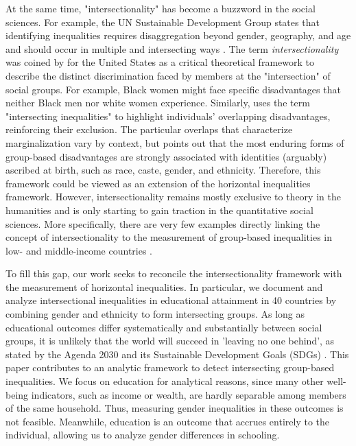 At the same time, "intersectionality" has become a buzzword in the social sciences. For example, the UN Sustainable Development Group states that identifying inequalities requires disaggregation beyond gender, geography, and age and should occur in multiple and intersecting ways \citep{UNSDG2022}. The term \textit{intersectionality} was coined by \cite{crenshaw1989, Crenshaw1991} for the United States as a critical theoretical framework to describe the distinct discrimination faced by members at the "intersection" of social groups. For example, Black women might face specific disadvantages that neither Black men nor white women experience. Similarly, \cite{kabeer2016} uses the term "intersecting inequalities" to highlight individuals' overlapping disadvantages, reinforcing their exclusion. The particular overlaps that characterize marginalization vary by context, but \cite{kabeer2016} points out that the most enduring forms of group-based disadvantages are strongly associated with identities (arguably) ascribed at birth, such as race, caste, gender, and ethnicity. Therefore, this framework could be viewed as an extension of the horizontal inequalities framework. However, intersectionality remains mostly exclusive to theory in the humanities and is only starting to gain traction in the quantitative social sciences. More specifically, there are very few examples directly linking the concept of intersectionality to the measurement of group-based inequalities in low- and middle-income countries \citep[see e.g.,][]{Kabeer2017, Lenhardt2015}.

To fill this gap, our work seeks to reconcile the intersectionality framework with the measurement of horizontal inequalities. In particular, we document and analyze intersectional inequalities in educational attainment in 40 countries by combining gender and ethnicity to form intersecting groups. As long as educational outcomes differ systematically and substantially between social groups, it is unlikely that the world will succeed in 'leaving no one behind', as stated by the Agenda 2030 and its Sustainable Development Goals (SDGs) \citep{Stuart2016}. This paper contributes to an analytic framework to detect intersecting group-based inequalities. We focus on education for analytical reasons, since many other well-being indicators, such as income or wealth, are hardly separable among members of the same household. Thus, measuring gender inequalities in these outcomes is not feasible. Meanwhile, education is an outcome that accrues entirely to the individual, allowing us to analyze gender differences in schooling. 

